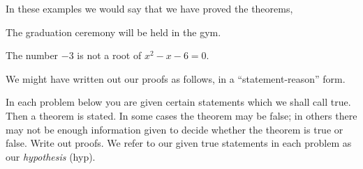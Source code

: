 \documentclass[11pt]{book}
\theoremstyle{bkplain}
\theoremstyle{XIplainnote}
\theoremstyle{bkplain}
\theoremstyle{bkplain}
\begin{document}
\medskip
In these examples we would say that we have proved the theorems,

\begin{exlist}
\item The graduation ceremony will be held in the gym.
\item The number $-3$ is not a root of $x^2 - x - 6 = 0$.
\end{exlist}

We might have written out our proofs as follows, in a ``statement-reason'' form.

\begin{steps}
\end{steps}

\begin{steps}
\end{steps}


In each problem below you are given certain statements which we shall call true.
Then a theorem is stated. In some cases the theorem may be false; in others there
may not be enough information given to decide whether the theorem is true or
false. Write out proofs. We refer to our given true statements in each problem as
our \emph{hypothesis} (hyp).
\end{document}
